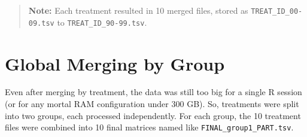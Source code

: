 \documentclass[
]{book}
\newenvironment{Shaded}{\begin{snugshade}}{\end{snugshade}}
\newcommand{\AttributeTok}[1]{\textcolor[rgb]{0.77,0.63,0.00}{#1}}
\newcommand{\BuiltInTok}[1]{#1}
\newcommand{\CommentTok}[1]{\textcolor[rgb]{0.56,0.35,0.01}{\textit{#1}}}
\newcommand{\ExtensionTok}[1]{#1}
\newcommand{\FunctionTok}[1]{\textcolor[rgb]{0.00,0.00,0.00}{#1}}
\newcommand{\NormalTok}[1]{#1}
\newcommand{\OperatorTok}[1]{\textcolor[rgb]{0.81,0.36,0.00}{\textbf{#1}}}
\newcommand{\PreprocessorTok}[1]{\textcolor[rgb]{0.56,0.35,0.01}{\textit{#1}}}
\newcommand{\StringTok}[1]{\textcolor[rgb]{0.31,0.60,0.02}{#1}}
\newcommand{\VariableTok}[1]{\textcolor[rgb]{0.00,0.00,0.00}{#1}}
\begin{document}
\begin{Shaded}
\end{Shaded}

\begin{quote}
\textbf{Note:} Each treatment resulted in 10 merged files, stored as \texttt{TREAT\_ID\_00-09.tsv} to \texttt{TREAT\_ID\_90-99.tsv}.
\end{quote}

\hypertarget{global-merging-by-group}{%
\section{Global Merging by Group}\label{global-merging-by-group}}

Even after merging by treatment, the data was still too big for a single R session (or for any mortal RAM configuration under 300 GB). So, treatments were split into two groups, each processed independently. For each group, the 10 treatment files were combined into 10 final matrices named like \texttt{FINAL\_group1\_PART.tsv}.
\end{document}
